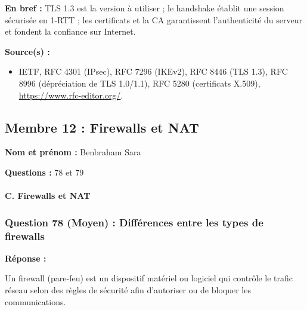 \documentclass[12pt,a4paper]{article}
\newcommand{\membre}[2]{%
  \textbf{Nom et prénom :} #1 \par
  \textbf{Questions :} #2 \par
}
\newcommand{\reponse}{\textbf{Réponse :}\par}
\newcommand{\sources}{\textbf{Source(s) :}}
\begin{document}
\textbf{En bref :} TLS 1.3 est la version à utiliser ; le handshake
établit une session sécurisée en 1-RTT ; les certificats et la CA
garantissent l'authenticité du serveur et fondent la confiance sur
Internet.

\sources
\begin{itemize}
    \item IETF, RFC 4301 (IPsec), RFC 7296 (IKEv2), RFC 8446 (TLS 1.3),
    RFC 8996 (dépréciation de TLS 1.0/1.1), RFC 5280 (certificats X.509),
    \url{https://www.rfc-editor.org/}.
\end{itemize}

\subsection{Membre 12 : Firewalls et NAT}
\membre{Benbraham Sara}{78 et 79}

\paragraph{C. Firewalls et NAT}

\subsubsection*{Question 78 (Moyen) : Différences entre les types de firewalls}

\reponse
Un firewall (pare-feu) est un dispositif matériel ou logiciel qui
contrôle le trafic réseau selon des règles de sécurité afin
d'autoriser ou de bloquer les communications.
\end{document}
